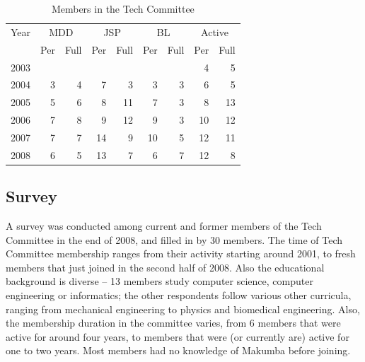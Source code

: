 \documentclass{sig-alt-release2}
\begin{document}
\begin{table}
	\centering
	\begin{tabular}{c|r|r|r|r|r|r|r|r|}
		\hline
		\hline
		Year 		& \multicolumn{2}{c|}{MDD} & \multicolumn{2}{c|}{JSP}	& \multicolumn{2}{c|}{BL}	& \multicolumn{2}{c|}{Active}	\\
					& Per & Full				& Per & Full				& Per & Full				& Per & Full	\\
		\hline
		\hline
		2003 &   &   &   &   &   &   & 4 & 5 \\
		\hline
		2004 & 3 & 4 & 7 & 3 & 3 & 3 & 6 & 5 \\
		\hline
		2005 & 5 & 6 & 8 & 11 & 7 & 3 & 8 & 13 \\
		\hline
		2006 & 7 & 8 & 9 & 12 & 9 & 3 & 10 & 12 \\
		\hline
		2007 & 7 & 7 & 14 & 9 & 10 & 5 & 12 & 11 \\
		\hline
		2008 & 6 & 5 & 13 & 7 & 6 & 7 & 12 & 8 \\
		\hline
		\hline

	\end{tabular}
	\caption{Members in the Tech Committee}
	\label{tab:itd-members}
\end{table} 

\subsection{Survey}\label{sec:techCommittee-survey}
A survey was conducted among current and former members of the Tech Committee in the end of 2008, and filled in by 30 members. The time of Tech Committee membership ranges from their activity starting around 2001, to fresh members that just joined in the second half of 2008. Also the educational background is diverse -- 13 members study computer science, computer engineering or informatics; the other respondents follow various other curricula, ranging from mechanical engineering to physics and biomedical engineering. Also, the membership duration in the committee varies, from 6 members that were active for around four years, to members that were (or currently are) active for one to two years. Most members had no knowledge of Makumba before joining.
\end{document}

